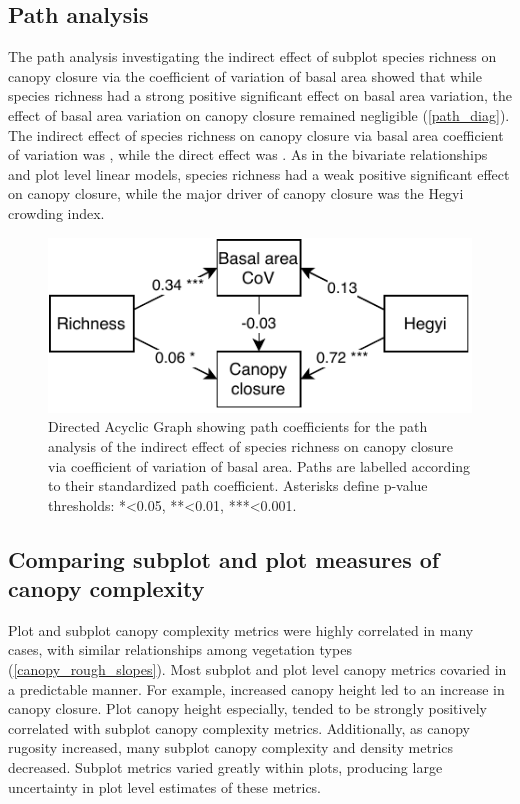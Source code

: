 \documentclass[11pt,a4paper]{article}
\begin{document}


\subsection{Path analysis}

The path analysis investigating the indirect effect of subplot species richness on canopy closure via the coefficient of variation of basal area showed that while species richness had a strong positive significant effect on basal area variation, the effect of basal area variation on canopy closure remained negligible (\autoref{path_diag}). The indirect effect of species richness on canopy closure via basal area coefficient of variation was \ccind{}, while the direct effect was \ccdir{}. As in the bivariate relationships and plot level linear models, species richness had a weak positive significant effect on canopy closure, while the major driver of canopy closure was the Hegyi crowding index.

\begin{figure}
	\includegraphics[width=0.8\linewidth]{path_diag}
	\caption{Directed Acyclic Graph showing path coefficients for the path analysis of the indirect effect of species richness on canopy closure via coefficient of variation of basal area. Paths are labelled according to their standardized path coefficient. Asterisks define p-value thresholds: *<0.05, **<0.01, ***<0.001.}
	\label{path_diag}
\end{figure}



\subsection{Comparing subplot and plot measures of canopy complexity}

Plot and subplot canopy complexity metrics were highly correlated in many cases, with similar relationships among vegetation types (\autoref{canopy_rough_slopes}). Most subplot and plot level canopy metrics covaried in a predictable manner. For example, increased canopy height led to an increase in canopy closure. Plot canopy height especially, tended to be strongly positively correlated with subplot canopy complexity metrics. Additionally, as canopy rugosity increased, many subplot canopy complexity and density metrics decreased. Subplot metrics varied greatly within plots, producing large uncertainty in plot level estimates of these metrics. 
\end{document}
